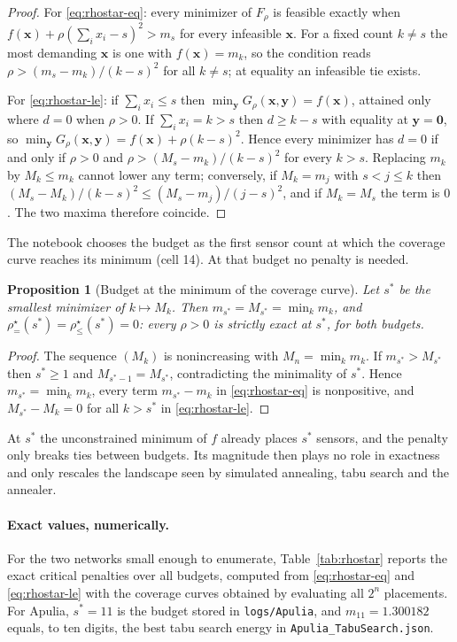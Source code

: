 \documentclass[11pt]{article}
\newtheorem{proposition}[theorem]{Proposition}
\newcommand{\x}{\mathbf{x}}
\newcommand{\y}{\mathbf{y}}
\newcommand{\rseq}{\rho^\star_{=}}
\newcommand{\rsle}{\rho^\star_{\le}}
\begin{document}
\begin{proof}
For \eqref{eq:rhostar-eq}: every minimizer of $F_\rho$ is feasible exactly when
$f(\x)+\rho(\sum_ix_i-s)^2>m_s$ for every infeasible $\x$. For a fixed count
$k\neq s$ the most demanding $\x$ is one with $f(\x)=m_k$, so the condition reads
$\rho>(m_s-m_k)/(k-s)^2$ for all $k\neq s$; at equality an infeasible tie exists.

For \eqref{eq:rhostar-le}: if $\sum_ix_i\le s$ then $\min_\y G_\rho(\x,\y)=f(\x)$,
attained only where $d=0$ when $\rho>0$. If $\sum_ix_i=k>s$ then $d\ge k-s$ with
equality at $\y=\mathbf0$, so $\min_\y G_\rho(\x,\y)=f(\x)+\rho(k-s)^2$. Hence every
minimizer has $d=0$ if and only if $\rho>0$ and $\rho>(M_s-m_k)/(k-s)^2$ for every
$k>s$. Replacing $m_k$ by $M_k\le m_k$ cannot lower any term; conversely, if
$M_k=m_j$ with $s<j\le k$ then $(M_s-M_k)/(k-s)^2\le(M_s-m_j)/(j-s)^2$, and if
$M_k=M_s$ the term is $0$. The two maxima therefore coincide.
\end{proof}

The notebook chooses the budget as the first sensor count at which the coverage
curve reaches its minimum (cell 14). At that budget no penalty is needed.

\begin{proposition}[Budget at the minimum of the coverage curve]
\label{prop:sstar}
Let $s^\ast$ be the smallest minimizer of $k\mapsto M_k$. Then
$m_{s^\ast}=M_{s^\ast}=\min_km_k$, and $\rseq(s^\ast)=\rsle(s^\ast)=0$: every
$\rho>0$ is strictly exact at $s^\ast$, for both budgets.
\end{proposition}

\begin{proof}
The sequence $(M_k)$ is nonincreasing with $M_n=\min_km_k$. If
$m_{s^\ast}>M_{s^\ast}$ then $s^\ast\ge1$ and
$M_{s^\ast-1}=M_{s^\ast}$, contradicting the minimality of $s^\ast$. Hence
$m_{s^\ast}=\min_km_k$, every term $m_{s^\ast}-m_k$ in \eqref{eq:rhostar-eq} is
nonpositive, and $M_{s^\ast}-M_k=0$ for all $k>s^\ast$ in \eqref{eq:rhostar-le}.
\end{proof}

At $s^\ast$ the unconstrained minimum of $f$ already places $s^\ast$ sensors, and
the penalty only breaks ties between budgets. Its magnitude then plays no role in
exactness and only rescales the landscape seen by simulated annealing, tabu search
and the annealer.

\paragraph{Exact values, numerically.}
For the two networks small enough to enumerate, Table~\ref{tab:rhostar} reports
the exact critical penalties over all budgets, computed from \eqref{eq:rhostar-eq}
and \eqref{eq:rhostar-le} with the coverage curves obtained by evaluating all
$2^n$ placements. For Apulia, $s^\ast=11$ is the budget stored in
\texttt{logs/Apulia}, and $m_{11}=1.300182$ equals, to ten digits, the best tabu
search energy in \texttt{Apulia\_TabuSearch.json}.
\end{document}
